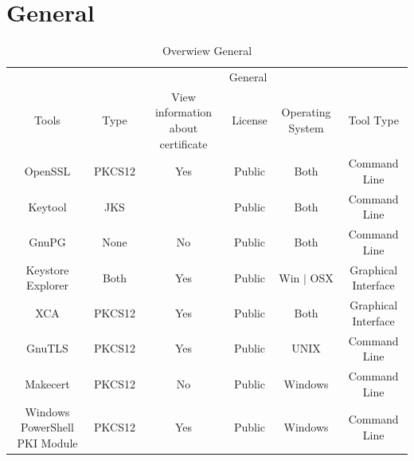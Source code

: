 \documentclass[10pt, a4paper]{report}
\begin{document}
\section{General}
\begin{table}[h!]
\centering
\caption{Overwiew General}
\label{my-label}
\begin{adjustbox}{max width=\textwidth}
\begin{tabular}{|c|c|c|c|c|c|}
\hline
                              & \multicolumn{5}{c|}{General}                                                                                   \\ \cline{2-6} 
\multirow{-2}{*}{Tools}       & Type   & View information about certificate                 & License & Operating System                        & Tool Type           \\ \hline
OpenSSL                       & PKCS12 & \cellcolor[HTML]{34FF34}Yes                        & Public  & \cellcolor[HTML]{34FF34}Both            & Command Line        \\ \hline
Keytool                       & JKS    & \cellcolor[HTML]{34FF34}{\color[HTML]{000000} Yes} & Public  & \cellcolor[HTML]{34FF34}Both            & Command Line        \\ \hline
GnuPG                         & None   & \cellcolor[HTML]{FE0000}No                         & Public  & \cellcolor[HTML]{34FF34}Both            & Command Line        \\ \hline
Keystore Explorer             & Both   & \cellcolor[HTML]{34FF34}Yes                        & Public  & \cellcolor[HTML]{FFC702}Win $\vert$ OSX & Graphical Interface \\ \hline
XCA                           & PKCS12 & \cellcolor[HTML]{34FF34}Yes                        & Public  & \cellcolor[HTML]{34FF34}Both            & Graphical Interface \\ \hline
GnuTLS                        & PKCS12 & \cellcolor[HTML]{34FF34}Yes                        & Public  & \cellcolor[HTML]{FFC702}UNIX            & Command Line        \\ \hline
Makecert                      & PKCS12 & \cellcolor[HTML]{FE0000}No			    & Public  & \cellcolor[HTML]{FFC702}Windows         & Command Line        \\ \hline
Windows PowerShell PKI Module & PKCS12 & \cellcolor[HTML]{34FF34}Yes			    & Public  & \cellcolor[HTML]{FFC702}Windows         & Command Line        \\ \hline
\end{tabular}
\end{adjustbox}
\end{table}
\end{document}

